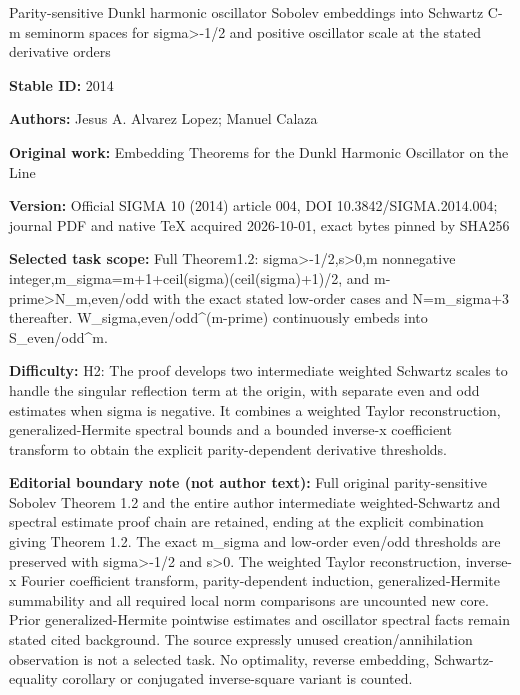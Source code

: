 \documentclass[11pt]{article}
\begin{document}
\begin{center}\Large Parity-sensitive Dunkl harmonic oscillator Sobolev embeddings into Schwartz C-m seminorm spaces for sigma>-1/2 and positive oscillator scale at the stated derivative orders\end{center}
\noindent\textbf{Stable ID:} 2014\par
\noindent\textbf{Authors:} Jesus A. Alvarez Lopez; Manuel Calaza\par
\noindent\textbf{Original work:} Embedding Theorems for the Dunkl Harmonic Oscillator on the Line\par
\noindent\textbf{Version:} Official SIGMA 10 (2014) article 004, DOI 10.3842/SIGMA.2014.004; journal PDF and native TeX acquired 2026-10-01, exact bytes pinned by SHA256\par
\noindent\textbf{Selected task scope:} Full Theorem1.2: sigma>-1/2,s>0,m nonnegative integer,m\_sigma=\allowbreak{}m+\allowbreak{}1+\allowbreak{}ceil(sigma)(ceil(sigma)+\allowbreak{}1)/2, and m-prime>N\_m,even/odd with the exact stated low-order cases and N=\allowbreak{}m\_sigma+\allowbreak{}3 thereafter. W\_sigma,even/odd\textasciicircum{}(m-prime) continuously embeds into S\_even/odd\textasciicircum{}m.\par
\noindent\textbf{Difficulty:} H2: The proof develops two intermediate weighted Schwartz scales to handle the singular reflection term at the origin, with separate even and odd estimates when sigma is negative. It combines a weighted Taylor reconstruction, generalized-Hermite spectral bounds and a bounded inverse-x coefficient transform to obtain the explicit parity-dependent derivative thresholds.\par
\noindent\textbf{Editorial boundary note (not author text):} Full original parity-sensitive Sobolev Theorem 1.2 and the entire author intermediate weighted-Schwartz and spectral estimate proof chain are retained, ending at the explicit combination giving Theorem 1.2. The exact m\_sigma and low-order even/odd thresholds are preserved with sigma>-1/2 and s>0. The weighted Taylor reconstruction, inverse-x Fourier coefficient transform, parity-dependent induction, generalized-Hermite summability and all required local norm comparisons are uncounted new core. Prior generalized-Hermite pointwise estimates and oscillator spectral facts remain stated cited background. The source expressly unused creation/annihilation observation is not a selected task. No optimality, reverse embedding, Schwartz-equality corollary or conjugated inverse-square variant is counted.\par
\end{document}

